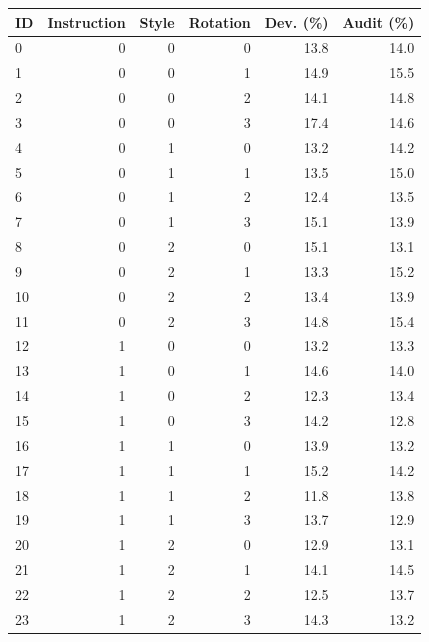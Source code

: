 \begin{tabular}{lrrrrr}
\toprule
ID & Instruction & Style & Rotation & Dev. (\%) & Audit (\%) \\
\midrule
0 & 0 & 0 & 0 & 13.8 & 14.0 \\
1 & 0 & 0 & 1 & 14.9 & 15.5 \\
2 & 0 & 0 & 2 & 14.1 & 14.8 \\
3 & 0 & 0 & 3 & 17.4 & 14.6 \\
4 & 0 & 1 & 0 & 13.2 & 14.2 \\
5 & 0 & 1 & 1 & 13.5 & 15.0 \\
6 & 0 & 1 & 2 & 12.4 & 13.5 \\
7 & 0 & 1 & 3 & 15.1 & 13.9 \\
8 & 0 & 2 & 0 & 15.1 & 13.1 \\
9 & 0 & 2 & 1 & 13.3 & 15.2 \\
10 & 0 & 2 & 2 & 13.4 & 13.9 \\
11 & 0 & 2 & 3 & 14.8 & 15.4 \\
12 & 1 & 0 & 0 & 13.2 & 13.3 \\
13 & 1 & 0 & 1 & 14.6 & 14.0 \\
14 & 1 & 0 & 2 & 12.3 & 13.4 \\
15 & 1 & 0 & 3 & 14.2 & 12.8 \\
16 & 1 & 1 & 0 & 13.9 & 13.2 \\
17 & 1 & 1 & 1 & 15.2 & 14.2 \\
18 & 1 & 1 & 2 & 11.8 & 13.8 \\
19 & 1 & 1 & 3 & 13.7 & 12.9 \\
20 & 1 & 2 & 0 & 12.9 & 13.1 \\
21 & 1 & 2 & 1 & 14.1 & 14.5 \\
22 & 1 & 2 & 2 & 12.5 & 13.7 \\
23 & 1 & 2 & 3 & 14.3 & 13.2 \\
\bottomrule
\end{tabular}
